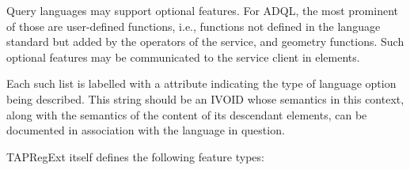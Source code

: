 \documentclass{ivoa}
\begin{document}
\endgroup


Query languages may support optional features.  For ADQL, the most prominent
of those are user-defined functions, i.e., functions not defined in the language
standard but added by the operators of the service, and geometry functions.
Such optional features may be communicated to the service client in
 elements.  

Each such list is labelled with a  attribute
indicating the type of language option being described.
This string should be an IVOID whose semantics in this context,
along with the semantics of the content of its descendant 
 elements,
can be documented in association with the language in question.

TAPRegExt itself defines the following feature types:
\end{document}
